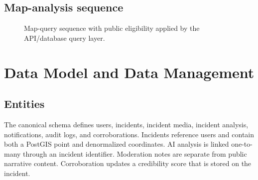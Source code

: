 \documentclass[11pt]{article}
\begin{document}
\subsection{Map-analysis sequence}

\begin{figure}[H]
\centering
{}
\caption{Map-query sequence with public eligibility applied by the API/database query layer.}
\label{fig:mapsequence}
\end{figure}

\section{Data Model and Data Management}
\label{sec:data}

\subsection{Entities}

The canonical schema defines users, incidents, incident media, incident
analysis, notifications, audit logs, and corroborations. Incidents reference
users and contain both a PostGIS point and denormalized coordinates. AI
analysis is linked one-to-many through an incident identifier. Moderation
notes are separate from public narrative content. Corroboration updates a
credibility score that is stored on the incident.
\end{document}
